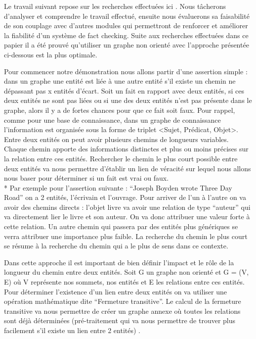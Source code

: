 Le travail suivant repose sur les recherches effectuées ici \cite{ciampaglia2015computational}. Nous tâcherons d'analyser et comprendre le travail effectué, ensuite nous évaluerons sa faisabilité de son couplage avec d'autres modules qui permettront de renforcer et améliorer la fiabilité d'un système de fact checking. Suite aux recherches effectuées dans ce papier il a été prouvé qu'utiliser un graphe non orienté avec l'approche présentée ci-dessous est la plus optimale.

Pour commencer notre démonstration nous allons partir d'une assertion simple : dans un graphe une entité est liée à une autre entité s'il existe un chemin ne dépassant pas  x entités d'écart. Soit un fait en rapport avec deux entités, si ces deux entités ne sont pas liées ou si une des deux entités n'est pas présente dans le graphe, alors il y a de fortes chances pour que ce fait soit faux. Pour rappel, comme pour une base de connaissance, dans un graphe de connaissance l'information est organisée sous la forme de triplet <Sujet, Prédicat, Objet>. Entre deux entités on peut avoir plusieurs chemins de longueurs variables. Chaque chemin apporte des informations distinctes et plus ou moins précises sur la relation entre ces entités. Rechercher le chemin le plus court possible entre deux entités va nous permettre d'établir un lien de véracité sur lequel nous allons nous baser pour déterminer si un fait est vrai ou faux.
\\*
Par exemple pour l'assertion suivante : \enquote{Joseph Boyden wrote Three Day Road} on a 2 entités, l'écrivain et l'ouvrage. Pour arriver de l'un à l'autre on va avoir des chemins directs : l'objet livre va avoir une relation de type \enquote{auteur} qui va directement lier le livre et son auteur. On va donc attribuer une valeur forte à cette relation. Un autre chemin qui passera par des entités plus génériques se verra attribuer une importance plus faible. La recherche du chemin le plus court se résume à la recherche du chemin qui a le plus de sens dans ce contexte.

Dans cette approche il est important de bien définir l'impact et le rôle de la longueur du chemin entre deux entités. 
Soit G un graphe non orienté et G = (V, E) où V représente nos sommets, nos entités et E les relations entre ces entités. Pour déterminer l'existence d'un lien entre deux entités on va utiliser une opération mathématique dite \enquote{Fermeture transitive}. Le calcul de la fermeture transitive va nous permettre de créer un graphe annexe où toutes les relations sont déjà déterminées (pré-traitement qui va nous permettre de trouver plus facilement s'il existe un lien entre 2 entités) \cite{JJLGraphes}.

